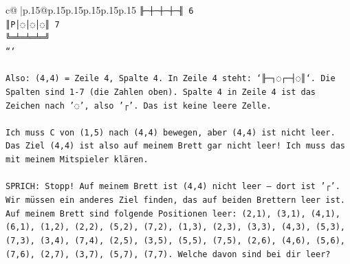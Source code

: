 \documentclass{article}
\begin{document}
{\begin{supertabular}{c@{$\;$}|p{.15\linewidth}@{}p{.15\linewidth}p{.15\linewidth}p{.15\linewidth}p{.15\linewidth}p{.15\linewidth}}
{{{\texttt{╟─┼─┼─┼─╢ 6} \\
\texttt{║P│◌│◌│◌║ 7} \\
\texttt{╚═╧═╧═╧═╝} \\
\texttt{```} \\
\\ 
\texttt{Also: (4,4) = Zeile 4, Spalte 4. In Zeile 4 steht: `╟─┐◌┌─┤◌║`. Die Spalten sind 1{-}7 (die Zahlen oben). Spalte 4 in Zeile 4 ist das Zeichen nach '◌', also '┌'. Das ist keine leere Zelle.} \\
\\ 
\texttt{Ich muss C von (1,5) nach (4,4) bewegen, aber (4,4) ist nicht leer. Das Ziel (4,4) ist also auf meinem Brett gar nicht leer! Ich muss das mit meinem Mitspieler klären.} \\
\\ 
\texttt{SPRICH: Stopp! Auf meinem Brett ist (4,4) nicht leer – dort ist '┌'. Wir müssen ein anderes Ziel finden, das auf beiden Brettern leer ist. Auf meinem Brett sind folgende Positionen leer: (2,1), (3,1), (4,1), (6,1), (1,2), (2,2), (5,2), (7,2), (1,3), (2,3), (3,3), (4,3), (5,3), (7,3), (3,4), (7,4), (2,5), (3,5), (5,5), (7,5), (2,6), (4,6), (5,6), (7,6), (2,7), (3,7), (5,7), (7,7). Welche davon sind bei dir leer?} \\
            }
        }
    }
     \\ \\


\end{supertabular}}
\end{document}
